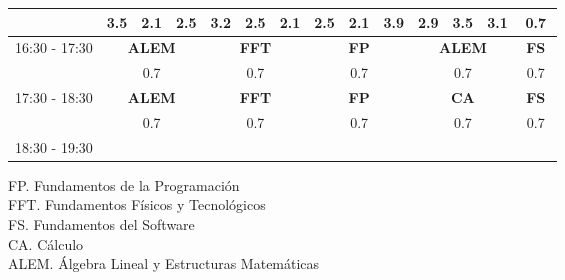\documentclass[10pt,spanish, landscape]{article}
\begin{document}
\begin{minipage}{0.7\textwidth}
\begin{tabular}{|c|ccc|ccc|ccc|ccc|ccc|}
 & {\footnotesize 3.5} & {\footnotesize 2.1} & {\footnotesize 2.5} & {\footnotesize 3.2} & {\footnotesize 2.5} & {\footnotesize 2.1} & {\footnotesize 2.5} & {\footnotesize 2.1} & {\footnotesize 3.9} & {\footnotesize 2.9} & {\footnotesize 3.5} & {\footnotesize 3.1}& \multicolumn{3}{|c|}{ \cellcolor{grisclaro} {\footnotesize 0.7}}\\ 
 \hline
\multirow{2}{*}{16:30 - 17:30} & \multicolumn{3}{|c|}{ \cellcolor{grisclaro} \textbf{ALEM}}& \multicolumn{3}{|c|}{ \cellcolor{grisclaro} \textbf{FFT}}& \multicolumn{3}{|c|}{ \cellcolor{grisclaro} \textbf{FP}}& \multicolumn{3}{|c|}{ \cellcolor{grisclaro} \textbf{ALEM}}& \multicolumn{3}{|c|}{ \cellcolor{grisclaro} \textbf{FS}}\\ 
& \multicolumn{3}{|c|}{ \cellcolor{grisclaro} {\footnotesize 0.7}}& \multicolumn{3}{|c|}{ \cellcolor{grisclaro} {\footnotesize 0.7}}& \multicolumn{3}{|c|}{ \cellcolor{grisclaro} {\footnotesize 0.7}}& \multicolumn{3}{|c|}{ \cellcolor{grisclaro} {\footnotesize 0.7}}& \multicolumn{3}{|c|}{ \cellcolor{grisclaro} {\footnotesize 0.7}}\\ 
 \hline
\multirow{2}{*}{17:30 - 18:30} & \multicolumn{3}{|c|}{ \cellcolor{grisclaro} \textbf{ALEM}}& \multicolumn{3}{|c|}{ \cellcolor{grisclaro} \textbf{FFT}}& \multicolumn{3}{|c|}{ \cellcolor{grisclaro} \textbf{FP}}& \multicolumn{3}{|c|}{ \cellcolor{grisclaro} \textbf{CA}}& \multicolumn{3}{|c|}{ \cellcolor{grisclaro} \textbf{FS}}\\ 
& \multicolumn{3}{|c|}{ \cellcolor{grisclaro} {\footnotesize 0.7}}& \multicolumn{3}{|c|}{ \cellcolor{grisclaro} {\footnotesize 0.7}}& \multicolumn{3}{|c|}{ \cellcolor{grisclaro} {\footnotesize 0.7}}& \multicolumn{3}{|c|}{ \cellcolor{grisclaro} {\footnotesize 0.7}}& \multicolumn{3}{|c|}{ \cellcolor{grisclaro} {\footnotesize 0.7}}\\ 
 \hline
\multirow{2}{*}{18:30 - 19:30}  &  &  &  &  &  &  &  &  &  &  &  &  &  &  & \\ 
 &  &  &  &  &  &  &  &  &  &  &  &  &  &  & \\ 
 \hline

\end{tabular}
\end{minipage}
\begin{minipage}{0.25\textwidth}
FP. Fundamentos de la Programación\\[0.5cm]
FFT. Fundamentos Físicos y Tecnológicos\\[0.5cm]
FS. Fundamentos del Software\\[0.5cm]
CA. Cálculo\\[0.5cm]
ALEM. Álgebra Lineal y Estructuras Matemáticas\\[0.5cm]
\end{minipage}
\newpage
\end{document}
